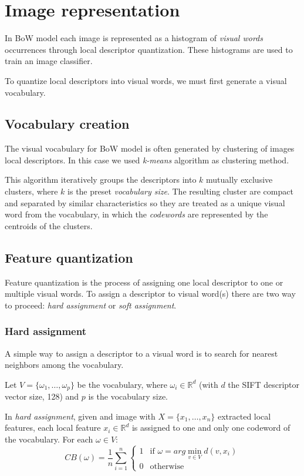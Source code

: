 \section{Image representation}

In BoW model each image is represented as a histogram of \emph{visual words} occurrences through local descriptor quantization\cite{DBLP:journals/corr/abs-1304-5168}. These histograms are used to train an image classifier.

To quantize local descriptors into visual words, we must first generate a visual vocabulary. 

\subsection{Vocabulary creation}

The visual vocabulary for BoW model is often generated by clustering of images local descriptors. In this case we used \emph{k-means} algorithm as clustering method.

This algorithm iteratively groups the descriptors into $k$ mutually exclusive clusters, where $k$ is the preset \emph{vocabulary size}. The resulting cluster are compact and separated by similar characteristics so they are treated as a unique visual word from the vocabulary, in which the \emph{codewords} are represented by the centroids of the clusters.

\subsection{Feature quantization}

Feature quantization is the process of assigning one local descriptor to one or multiple
visual words. To assign a descriptor to visual word(s) there are two way to proceed: \emph{hard assignment} or \emph{soft assignment}.

\subsubsection{Hard assignment}

A simple way to assign a descriptor to a visual word is to search for nearest neighbors among the vocabulary.

Let $V = \{\omega_1, \ldots, \omega_p \}$ be the vocabulary, where $\omega_i \in \mathbb{R}^{d}$ (with $d$ the SIFT descriptor vector size, 128) and $p$ is the vocabulary size.

In \emph{hard assignment}, given and image with $X = \{x_1, \ldots, x_n\}$ extracted local features, each local feature $x_i \in \mathbb{R}^{d}$ is assigned to one and only one codeword of the vocabulary. For each $\omega \in V$:
\begin{equation}
CB(\omega) = \frac{1}{n} \sum_{i = 1}^{n} \left\{
\begin{array}{rl}
1 & \mbox{if } \omega = arg \min_{v \in V} d(v, x_i) \\
0 & \mbox{otherwise}
\end{array}
\right.
\end{equation}

